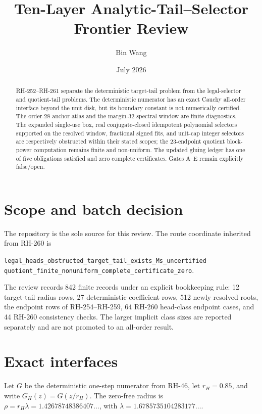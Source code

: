 \documentclass[11pt]{article}
\title{Ten-Layer Analytic-Tail--Selector Frontier Review}
\author{Bin Wang}
\date{July 2026}
\begin{document}
\maketitle
\sloppy

\begin{abstract}
RH-252--RH-261 separate the deterministic target-tail problem from the
legal-selector and quotient-tail problems.  The deterministic numerator has
an exact Cauchy all-order interface beyond the unit disk, but its boundary
constant is not numerically certified.  The order-28 anchor atlas and the
margin-32 spectral window are finite diagnostics.  The expanded single-use
box, real conjugate-closed idempotent polynomial selectors supported on the
resolved window, fractional signed fits, and unit-cap integer selectors are
respectively obstructed within their stated scopes;
the 23-endpoint quotient block-power computation remains finite and
non-uniform.  The updated gluing ledger has one of five obligations satisfied
and zero complete certificates.  Gates A--E remain explicitly false/open.
\end{abstract}

\section{Scope and batch decision}

The repository is the sole source for this review.  The route coordinate
inherited from RH-260 is
\begin{center}
\texttt{legal\_heads\_obstructed\_target\_tail\_exists\_Ms\_uncertified\\
quotient\_finite\_nonuniform\_complete\_certificate\_zero}.
\end{center}
The review records 842 finite records under an explicit bookkeeping rule:
12 target-tail radius rows, 27 deterministic coefficient rows, 512 newly
resolved roots, the endpoint rows of RH-254--RH-259, 64 RH-260 head-class
endpoint cases, and 44 RH-260 consistency checks.  The larger implicit class
sizes are reported separately and are not promoted to an all-order result.

\section{Exact interfaces}

Let $G$ be the deterministic one-step numerator from RH-46, let
$r_H=0.85$, and write $G_H(z)=G(z/r_H)$.  The zero-free radius is
$\rho=r_H\lambda=1.42678748386407\ldots$, with
$\lambda=1.6785735104283177\ldots$.
\end{document}
